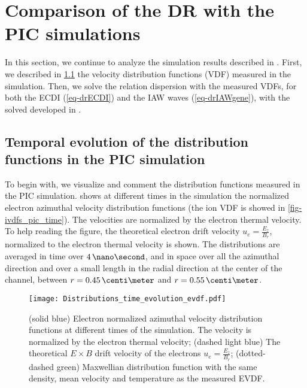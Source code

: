 \FloatBarrier
\section{Comparison of the \acs{DR} with the \acs{PIC} simulations}
  \label{sec-DR-results}
  
  In this section, we continue to analyze the simulation results described in .
  First, we described in \cref{subsec-VDFpic} the velocity distribution functions (VDF) measured in the simulation.
  Then, we solve the relation dispersion with the measured VDFs, for both the \ac{ECDI} (\cref{eq-drECDI}) and the \ac{IAW} waves (\cref{eq-drIAWgene}), with the solved developed in .

  \subsection{Temporal evolution of the distribution functions in the \acs{PIC} simulation} \label{subsec-VDFpic}
  
  To begin with, we visualize and comment the distribution functions measured in the \ac{PIC} simulation.
   shows at different times in the simulation the normalized electron azimuthal velocity distribution functions (the ion VDF is showed in \cref{fig-ivdfs_pic_time}).
  The velocities are normalized by the electron thermal velocity.
  To help reading the figure, the  theoretical electron drift velocity $u_e = \frac{E_z}{B_r}$, normalized to the electron thermal velocity is shown.
  The distributions are averaged in time over $4\,\nano\second$, and in space over all the azimuthal direction and over a small length in the radial direction at the center of the channel, between $r=0.45\,\centi\meter$ and $r=0.55\,\centi\meter$.
  
  \begin{figure}[!hbt]
    \centering
    \texttt{[image: Distributions\_time\_evolution\_evdf.pdf]}
    \caption{(solid blue) Electron normalized azimuthal velocity distribution functions at different times of the simulation. The velocity is normalized by the electron thermal velocity; (dashed light blue) The theoretical $E\times B$ drift velocity of the electrons $u_e = \frac{E_z}{B_r}$; (dotted-dashed green) Maxwellian  distribution function with the same density, mean velocity and temperature as the measured \acs{EVDF}.}
    \label{fig-vdfs_pic_time}
  \end{figure}
  
